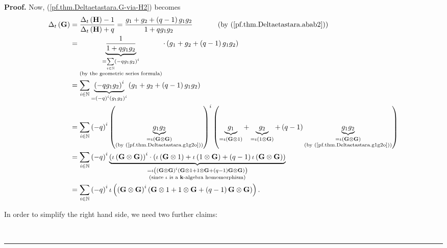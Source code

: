 \documentclass[numbers=enddot,12pt,final,onecolumn,notitlepage]{scrartcl}%
\theoremstyle{definition}
\newenvironment{proof}[1][Proof]{\noindent\textbf{#1.} }{\ \rule{0.5em}{0.5em}}
\let\sumnonlimits\sum
\renewcommand{\sum}{\sumnonlimits\limits}
\begin{document}
\begin{proof}
Now, (\ref{pf.thm.Deltaetastara.G-via-H2}) becomes%
\begin{align*}
\Delta_{t}\left(  \mathbf{G}\right)   &  =\dfrac{\Delta_{t}\left(
\mathbf{H}\right)  -1}{\Delta_{t}\left(  \mathbf{H}\right)  +q}=\dfrac
{g_{1}+g_{2}+\left(  q-1\right)  g_{1}g_{2}}{1+qg_{1}g_{2}}%
\ \ \ \ \ \ \ \ \ \ \left(  \text{by (\ref{pf.thm.Deltaetastara.abab2}%
)}\right) \\
&  =\underbrace{\dfrac{1}{1+qg_{1}g_{2}}}_{\substack{=\sum_{i\in\mathbb{N}%
}\left(  -qg_{1}g_{2}\right)  ^{i}\\\text{(by the geometric series formula)}%
}}\cdot\left(  g_{1}+g_{2}+\left(  q-1\right)  g_{1}g_{2}\right) \\
&  =\sum_{i\in\mathbb{N}}\underbrace{\left(  -qg_{1}g_{2}\right)  ^{i}%
}_{=\left(  -q\right)  ^{i}\left(  g_{1}g_{2}\right)  ^{i}}\left(  g_{1}%
+g_{2}+\left(  q-1\right)  g_{1}g_{2}\right) \\
&  =\sum_{i\in\mathbb{N}}\left(  -q\right)  ^{i}\left(  \underbrace{g_{1}%
g_{2}}_{\substack{=\iota\left(  \mathbf{G}\otimes\mathbf{G}\right)
\\\text{(by (\ref{pf.thm.Deltaetastara.g1g2o}))}}}\right)  ^{i}\left(
\underbrace{g_{1}}_{=\iota\left(  \mathbf{G}\otimes1\right)  }%
+\underbrace{g_{2}}_{=\iota\left(  1\otimes\mathbf{G}\right)  }+\left(
q-1\right)  \underbrace{g_{1}g_{2}}_{\substack{=\iota\left(  \mathbf{G}%
\otimes\mathbf{G}\right)  \\\text{(by (\ref{pf.thm.Deltaetastara.g1g2o}))}%
}}\right) \\
&  =\sum_{i\in\mathbb{N}}\left(  -q\right)  ^{i}\underbrace{\left(
\iota\left(  \mathbf{G}\otimes\mathbf{G}\right)  \right)  ^{i}\cdot\left(
\iota\left(  \mathbf{G}\otimes1\right)  +\iota\left(  1\otimes\mathbf{G}%
\right)  +\left(  q-1\right)  \iota\left(  \mathbf{G}\otimes\mathbf{G}\right)
\right)  }_{\substack{=\iota\left(  \left(  \mathbf{G}\otimes\mathbf{G}%
\right)  ^{i}\left(  \mathbf{G}\otimes1+1\otimes\mathbf{G}+\left(  q-1\right)
\mathbf{G}\otimes\mathbf{G}\right)  \right)  \\\text{(since }\iota\text{ is a
}\mathbf{k}\text{-algebra homomorphism)}}}\\
&  =\sum_{i\in\mathbb{N}}\left(  -q\right)  ^{i}\iota\left(  \left(
\mathbf{G}\otimes\mathbf{G}\right)  ^{i}\left(  \mathbf{G}\otimes
1+1\otimes\mathbf{G}+\left(  q-1\right)  \mathbf{G}\otimes\mathbf{G}\right)
\right)  .
\end{align*}


In order to simplify the right hand side, we need two further claims:


\end{proof}
\end{document}
